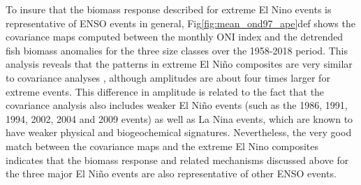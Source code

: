 To insure that the biomass response described for extreme El Nino events is representative of ENSO events in general, Fig\ref{fig:mean_ond97_ape}def shows the covariance maps computed between the monthly ONI index and the detrended fish biomass anomalies for the three size classes over the 1958-2018 period. This analysis reveals that the patterns in extreme El Niño composites are very similar to covariance analyses , although amplitudes are about four times larger for extreme events. This  difference  in amplitude is related to the fact that the covariance analysis also includes weaker El Niño events (such as the 1986, 1991, 1994, 2002, 2004 and 2009 events) as well as La Nina events, which are known to have weaker physical and biogeochemical signatures. Nevertheless, the very good match between the covariance maps and the extreme El Nino composites indicates that the biomass response and related mechanisms discussed above for the three major El Niño events are also representative of other ENSO events.